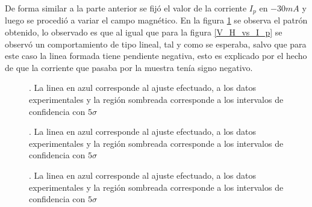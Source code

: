 \documentclass[%
 reprint,
 amsmath,amssymb,
 aps,
]{revtex4-1}
\begin{document}
 De forma similar a la parte anterior se fijó el valor de la corriente $I_p$ en $-30 mA$ y luego se procedió a variar el campo magnético. En la figura \ref{V_H_vs_campo}  se observa el patrón obtenido, lo observado es que al igual que para la figura \ref{V_H_vs_I_p} se observó un comportamiento de tipo lineal, tal y como se esperaba, salvo que para este caso la linea formada tiene pendiente negativa, esto es explicado por el hecho de que la corriente que pasaba por la muestra tenía signo negativo.
\begin{figure}[h]
\caption{\label{V_H_vs_campo}.  La linea en azul corresponde al ajuste efectuado, a los datos experimentales y la región sombreada corresponde a los intervalos de confidencia con $5\sigma$}
\end{figure}

\begin{figure}[h]
\caption{\label{V longitudinal vs ip}.  La linea en azul corresponde al ajuste efectuado, a los datos experimentales y la región sombreada corresponde a los intervalos de confidencia con $5\sigma$}
\end{figure}

\begin{figure}[h]
\caption{\label{R_vs_Campo}.  La linea en azul corresponde al ajuste efectuado, a los datos experimentales y la región sombreada corresponde a los intervalos de confidencia con $5\sigma$}
\end{figure}
\end{document}
